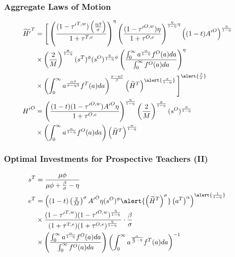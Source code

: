 \documentclass[11pt]{beamer}
\begin{document}
\begin{frame}
\frametitle{Aggregate Laws of Motion} 
\begin{align}
\widetilde{H'}^{T} & = \Bigg[ \left(\frac{(1-{\tau'}^{T,w})\left(\tfrac{\eta \beta}{\sigma}\right)}{1+\tau^{T,e}} \right)^\eta \left(\frac{(1-{\tau'}^{O,w}) \eta}{1+\tau^{O,e}} \right)^{\frac{\eta}{1-\eta} \eta} \left((1-t){A'}^O \right)^\frac{\eta}{1-\eta}\nonumber\\
& \times  \left(\frac{2}{M}\right)^\frac{\sigma}{1-\eta} (s^{T})^\phi (s^{O})^{\frac{\eta}{1-\eta}\phi} \left(\frac{\int_0^\infty a^\frac{\alpha}{1-\eta} f^O(a) da}{\int_0^\infty f^O(a) da} \right)^\eta
 \nonumber\\
& \times  \left(\int_0^\infty a^\frac{\alpha\beta}{\sigma-\eta\beta} f^T(a) da\right)^{\frac{\sigma-\eta\beta}{\beta}} \left(\widetilde{H}^T\right)^{\alert{\frac{\sigma}{1-\eta}}} \Bigg]^{\alert{\frac{\beta}{\sigma}}} \nonumber\\
{H'}^{O} & = \left( \frac{(1-t)(1-{\tau'}^{O,w}){A'}^O \eta}{1+\tau^{O,e}}\right)^{\frac{\eta}{1-\eta}} \left(\frac{2}{M}\right)^\frac{\sigma}{1-\eta} (s^{O})^\frac{\phi}{1-\eta} \nonumber\\
& \times \left(\int_0^\infty a^\frac{\alpha}{1-\eta} f^O(a) da\right) \left(\widetilde{H}^T\right)^\frac{\sigma}{1-\eta} \nonumber
\end{align}
\end{frame}

\begin{frame}
\frametitle{Optimal Investments for Prospective Teachers (II)} 
\begin{align}
s^{T} & = \frac{\mu \phi}{\mu \phi+\frac{\beta}{\sigma}-\eta} \nonumber\\
e^{T} & = \left( (1-t) \left(\tfrac{2}{M}\right)^\sigma {A'}^O \eta (s^{O})^\phi \alert{\left(\widetilde{H}^T\right)^\sigma} \left(a^{T}\right)^\alpha\right)^{\alert{\frac{1}{1-\eta}}} \nonumber\\
& \times \frac{(1-{\tau'}^{T,w})(1-{\tau'}^{O,w})^\frac{\eta}{1-\eta}}{(1+{\tau}^{T,e})(1+{\tau}^{O,e})^\frac{\eta}{1-\eta}} \cdot \frac{\beta}{\sigma} \nonumber\\
& \times \left( \frac{\int_0^\infty a^\frac{\alpha}{1-\eta} f^O(a) da}{\int_0^\infty f^O(a) da}\right) \left( \int_0^\infty a^\frac{\alpha}{\frac{\sigma}{\beta}-\eta} f^T(a) da \right)^{-1} \nonumber
\end{align}

\end{frame}
\end{document}
